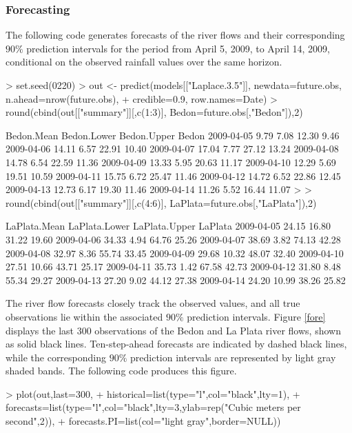\subsubsection{Forecasting}
The following code generates forecasts of the river flows and their corresponding $90\%$ prediction intervals for the period from April 5, 2009, to April 14, 2009, conditional on the observed rainfall values over the same horizon. 

\begin{example}
> set.seed(0220)
> out <- predict(models[["Laplace.3.5"]], newdata=future.obs, n.ahead=nrow(future.obs), 
+                credible=0.9, row.names=Date)
> round(cbind(out[["summary"]][,c(1:3)], Bedon=future.obs[,"Bedon"]),2)

           Bedon.Mean Bedon.Lower Bedon.Upper Bedon
2009-04-05       9.79        7.08       12.30  9.46
2009-04-06      14.11        6.57       22.91 10.40
2009-04-07      17.04        7.77       27.12 13.24
2009-04-08      14.78        6.54       22.59 11.36
2009-04-09      13.33        5.95       20.63 11.17
2009-04-10      12.29        5.69       19.51 10.59
2009-04-11      15.75        6.72       25.47 11.46
2009-04-12      14.72        6.52       22.86 12.45
2009-04-13      12.73        6.17       19.30 11.46
2009-04-14      11.26        5.52       16.44 11.07
>
> round(cbind(out[["summary"]][,c(4:6)], LaPlata=future.obs[,"LaPlata"]),2)

           LaPlata.Mean LaPlata.Lower LaPlata.Upper LaPlata
2009-04-05        24.15         16.80         31.22   19.60
2009-04-06        34.33          4.94         64.76   25.26
2009-04-07        38.69          3.82         74.13   42.28
2009-04-08        32.97          8.36         55.74   33.45
2009-04-09        29.68         10.32         48.07   32.40
2009-04-10        27.51         10.66         43.71   25.17
2009-04-11        35.73          1.42         67.58   42.73
2009-04-12        31.80          8.48         55.34   29.27
2009-04-13        27.20          9.02         44.12   27.38
2009-04-14        24.20         10.99         38.26   25.82
\end{example}
The river flow forecasts closely track the observed values, and all true observations lie within the associated $90\%$ prediction intervals. Figure \ref{fore} displays the last 300 observations of the Bedon and La Plata river flows, shown as solid black lines. Ten-step-ahead forecasts are indicated by dashed black lines, while the corresponding $90\%$ prediction intervals are represented by light gray shaded bands. The following code produces this figure.
\begin{example}
> plot(out,last=300,
+          historical=list(type="l",col="black",lty=1),
+          forecasts=list(type="l",col="black",lty=3,ylab=rep("Cubic meters per second",2)),
+          forecasts.PI=list(col="light gray",border=NULL))
\end{example}

